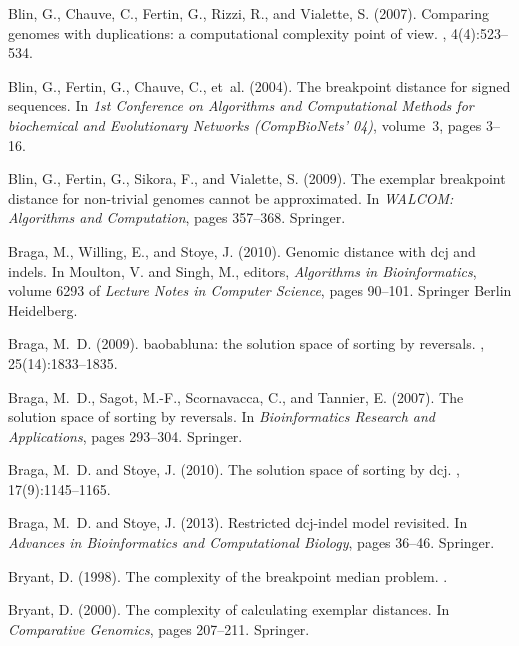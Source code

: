 \documentclass[11pt,final,twoside,nofrench]{thlifl}
\begin{document}
\begin{thebibliography}{}
Blin, G., Chauve, C., Fertin, G., Rizzi, R., and Vialette, S. (2007).
\newblock Comparing genomes with duplications: a computational complexity point
  of view.
, 4(4):523--534.

Blin, G., Fertin, G., Chauve, C., et~al. (2004).
\newblock The breakpoint distance for signed sequences.
\newblock In {\em 1st Conference on Algorithms and Computational Methods for
  biochemical and Evolutionary Networks (CompBioNets' 04)}, volume~3, pages
  3--16.

Blin, G., Fertin, G., Sikora, F., and Vialette, S. (2009).
\newblock The exemplar breakpoint distance for non-trivial genomes cannot be
  approximated.
\newblock In {\em WALCOM: Algorithms and Computation}, pages 357--368.
  Springer.

Braga, M., Willing, E., and Stoye, J. (2010).
\newblock Genomic distance with dcj and indels.
\newblock In Moulton, V. and Singh, M., editors, {\em Algorithms in
  Bioinformatics}, volume 6293 of {\em Lecture Notes in Computer Science},
  pages 90--101. Springer Berlin Heidelberg.

Braga, M.~D. (2009).
\newblock baobabluna: the solution space of sorting by reversals.
, 25(14):1833--1835.

Braga, M.~D., Sagot, M.-F., Scornavacca, C., and Tannier, E. (2007).
\newblock The solution space of sorting by reversals.
\newblock In {\em Bioinformatics Research and Applications}, pages 293--304.
  Springer.

Braga, M.~D. and Stoye, J. (2010).
\newblock The solution space of sorting by dcj.
, 17(9):1145--1165.

Braga, M.~D. and Stoye, J. (2013).
\newblock Restricted dcj-indel model revisited.
\newblock In {\em Advances in Bioinformatics and Computational Biology}, pages
  36--46. Springer.

Bryant, D. (1998).
\newblock The complexity of the breakpoint median problem.
.

Bryant, D. (2000).
\newblock The complexity of calculating exemplar distances.
\newblock In {\em Comparative Genomics}, pages 207--211. Springer.


\end{thebibliography}
\end{document}
